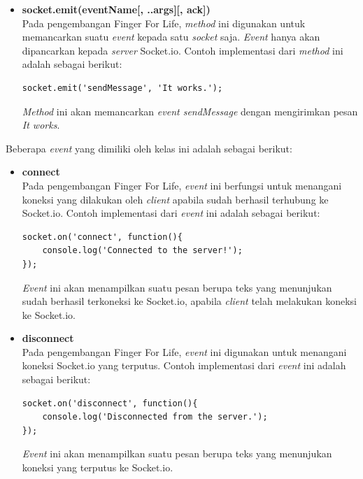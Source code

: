 \begin{enumerate}
\begin{enumerate}
\begin{enumerate}
\begin{itemize}
				\item \textbf{socket.emit(eventName[, ..args][, ack])} \\
				Pada pengembangan Finger For Life, \textit{method} ini digunakan untuk memancarkan suatu \textit{event} kepada satu \textit{socket} saja. \textit{Event} hanya akan dipancarkan kepada \textit{server} Socket.io. Contoh implementasi dari \textit{method} ini adalah sebagai berikut:
\begin{lstlisting}
socket.emit('sendMessage', 'It works.');
\end{lstlisting}
\textit{Method} ini akan memancarkan \textit{event sendMessage} dengan mengirimkan pesan \textit{It works}.
			\end{itemize}
			
			Beberapa \textit{event} yang dimiliki oleh kelas ini adalah sebagai berikut:
			\begin{itemize}
				\item \textbf{connect} \\
				Pada pengembangan Finger For Life, \textit{event} ini berfungsi untuk menangani koneksi yang dilakukan oleh \textit{client} apabila sudah berhasil terhubung ke Socket.io. Contoh implementasi dari \textit{event} ini adalah sebagai berikut:
\begin{lstlisting}
socket.on('connect', function(){
	console.log('Connected to the server!');
});
\end{lstlisting}
				\textit{Event} ini akan menampilkan suatu pesan berupa teks yang menunjukan sudah berhasil terkoneksi ke Socket.io, apabila \textit{client} telah melakukan koneksi ke Socket.io.

				\item \textbf{disconnect} \\
				Pada pengembangan Finger For Life, \textit{event} ini digunakan untuk menangani koneksi Socket.io yang terputus. Contoh implementasi dari \textit{event} ini adalah sebagai berikut:
\begin{lstlisting}
socket.on('disconnect', function(){
	console.log('Disconnected from the server.');
});
\end{lstlisting}
				\textit{Event} ini akan menampilkan suatu pesan berupa teks yang menunjukan koneksi yang terputus ke Socket.io.

			\end{itemize}
		\end{enumerate}
	\end{enumerate}
	

\end{enumerate}
